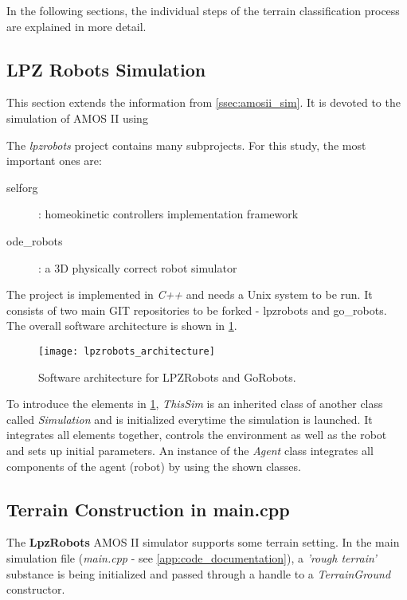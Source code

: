In the following sections, the individual steps of the terrain classification process are explained in more detail.

\subsection*{LPZ Robots Simulation} \label{ssec:app:lpzrobots_sim}
This section extends the information from \cref{ssec:amosii_sim}. It is devoted to the simulation of AMOS II using \citep{misc:lpzrobots}

The \textit{lpzrobots} project contains many subprojects. For this study, the most important ones are:

\begin{description}
\item[selforg] : homeokinetic controllers implementation framework
\item[ode\_robots] : a 3D physically correct robot simulator
\end{description}

The project is implemented in \textit{C++} and needs a Unix system to be run. It consists of two main GIT repositories to be forked - lpzrobots and go\_robots. The overall software architecture is shown in \cref{img:lpzrobots_architecture}.

\begin{figure}[H]
  \centering
  \texttt{[image: lpzrobots\_architecture]}
  \caption{Software architecture for LPZRobots and GoRobots. \citep{misc:lpzrobots}}
  \label{img:lpzrobots_architecture}
\end{figure}

To introduce the elements in \cref{img:lpzrobots_architecture}, \textit{ThisSim} is an inherited class of another class called \textit{Simulation} and is initialized everytime the simulation is launched. It integrates all elements together, controls the environment as well as the robot and sets up initial parameters. An instance of the \textit{Agent} class integrates all components of the agent (robot) by using the shown classes.

\subsection*{Terrain Construction in main.cpp} \label{ssec:app:terrain_construction_in_main.cpp}
The \textbf{LpzRobots} AMOS II simulator supports some terrain setting. In the main simulation file (\textit{main.cpp} - see \ref{app:code_documentation}), a \textit{'rough terrain'} substance is being initialized and passed through a handle to a \textit{TerrainGround} constructor.

